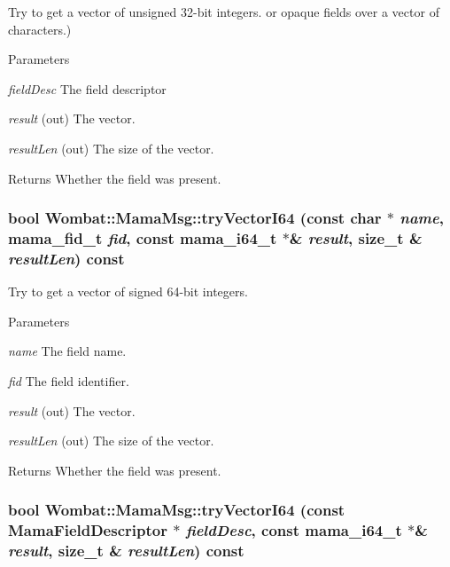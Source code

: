 Try to get a vector of unsigned 32-\/bit integers. or opaque fields over a vector of characters.) 
\begin{DoxyParams}{Parameters}
\item[{\em fieldDesc}]The field descriptor \item[{\em result}](out) The vector. \item[{\em resultLen}](out) The size of the vector. \end{DoxyParams}
\begin{DoxyReturn}{Returns}
Whether the field was present. 
\end{DoxyReturn}
\hypertarget{classWombat_1_1MamaMsg_ad50df98109596b72c97e4dcaaf91ad65}{
\subsubsection[{tryVectorI64}]{\setlength{\rightskip}{0pt plus 5cm}bool Wombat::MamaMsg::tryVectorI64 (const char $\ast$ {\em name}, \/  mama\_\-fid\_\-t {\em fid}, \/  const mama\_\-i64\_\-t $\ast$\& {\em result}, \/  size\_\-t \& {\em resultLen}) const}}
\label{classWombat_1_1MamaMsg_ad50df98109596b72c97e4dcaaf91ad65}


Try to get a vector of signed 64-\/bit integers. 
\begin{DoxyParams}{Parameters}
\item[{\em name}]The field name. \item[{\em fid}]The field identifier. \item[{\em result}](out) The vector. \item[{\em resultLen}](out) The size of the vector. \end{DoxyParams}
\begin{DoxyReturn}{Returns}
Whether the field was present. 
\end{DoxyReturn}
\hypertarget{classWombat_1_1MamaMsg_a51e2f41dc663dce50ee2001673fe55e5}{
\subsubsection[{tryVectorI64}]{\setlength{\rightskip}{0pt plus 5cm}bool Wombat::MamaMsg::tryVectorI64 (const {\bf MamaFieldDescriptor} $\ast$ {\em fieldDesc}, \/  const mama\_\-i64\_\-t $\ast$\& {\em result}, \/  size\_\-t \& {\em resultLen}) const}}
\label{classWombat_1_1MamaMsg_a51e2f41dc663dce50ee2001673fe55e5}



